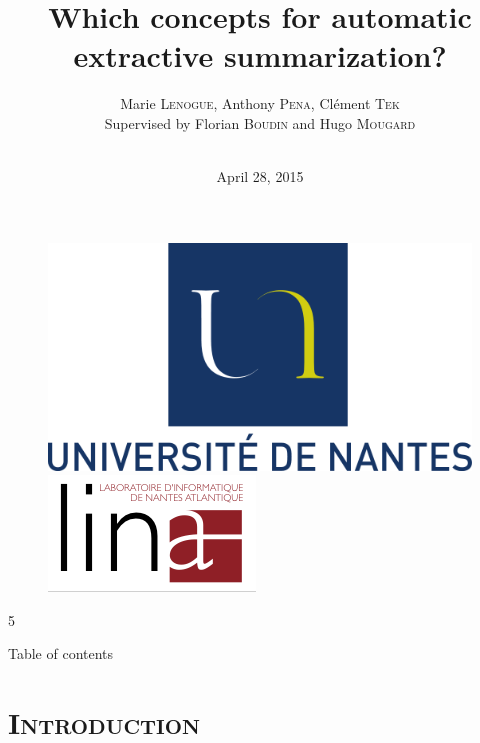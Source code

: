 \documentclass[xcolor=x11names,compress]{beamer}
\renewcommand{\(}{\begin{columns}}
\renewcommand{\)}{\end{columns}}
\newcommand{\<}[1]{\begin{column}{#1}}
\renewcommand{\>}{\end{column}}
\begin{document}
\section*{\scshape}
\begin{frame}
\title{Which concepts for automatic extractive summarization?}
\author{Marie \textsc{Lenogue}, Anthony \textsc{Pena}, Clément \textsc{Tek}\\
Supervised by Florian \textsc{Boudin} and Hugo \textsc{Mougard}\\
}


\date{
	\\
	\vspace{1cm}
	April 28, 2015
}
\titlepage
\begin{figure}[!h]
	\includegraphics[scale=0.15]{UN.png}
    \includegraphics[scale=0.3]{lina.png}
\end{figure}
5\end{frame}

\begin{frame}{Table of contents}
\tableofcontents
\end{frame}

\section{\scshape Introduction}
\end{document}
